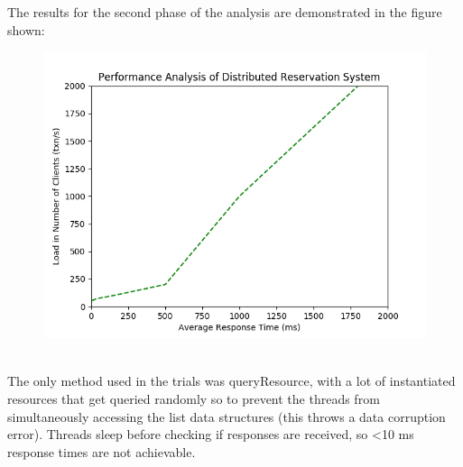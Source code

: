 \documentclass[letterpaper,12pt]{article}
\begin{document}
	The results for the second phase of the analysis are demonstrated in the figure shown:\\
	\begin{figure}[ht] 
		\centering \includegraphics[width=0.8\columnwidth]{performanal.png}
		
	\end{figure}\\
	The only method used in the trials was queryResource, with a lot of instantiated resources that get queried randomly so to prevent the threads from simultaneously accessing the list data structures (this throws a data corruption error). Threads sleep before checking if responses are received, so <10 ms response times are not achievable.
	
\end{document}
